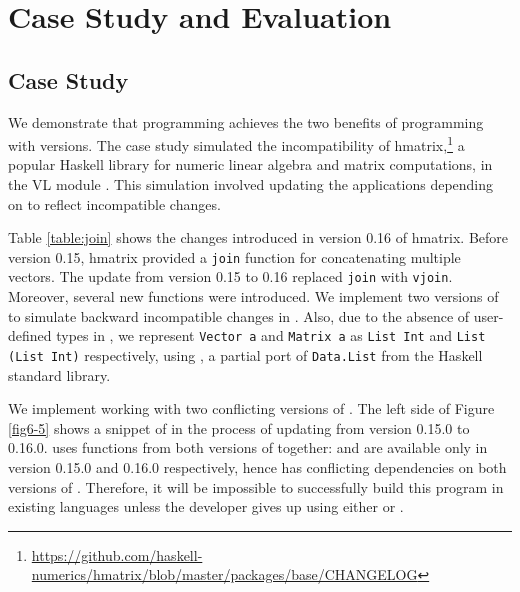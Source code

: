 \section{Case Study and Evaluation}
\label{casestudy}

\subsection{Case Study}
We demonstrate that \mylang{} programming achieves the two benefits of programming with versions. 
The case study simulated the incompatibility of hmatrix,\footnote{\url{https://github.com/haskell-numerics/hmatrix/blob/master/packages/base/CHANGELOG}} a popular Haskell library for numeric linear algebra and matrix computations, in the VL module .
This simulation involved updating the applications  depending on  to reflect incompatible changes.

Table \ref{table:join} shows the changes introduced in version 0.16 of hmatrix. Before version 0.15, hmatrix provided a \texttt{join} function for concatenating multiple vectors.
The update from version 0.15 to 0.16 replaced \texttt{join} with \texttt{vjoin}. Moreover, several new functions were introduced.
We implement two versions of  to simulate backward incompatible changes in \mylang{}.
Also, due to the absence of user-defined types in \mylang{}, we represent \texttt{Vector a} and \texttt{Matrix a} as \texttt{List Int} and \texttt{List (List Int)} respectively, using , a partial port of \texttt{Data.List} from the Haskell standard library.


We implement  working with two conflicting versions of . The left side of Figure \ref{fig6-5} shows a snippet of  in the process of updating  from version 0.15.0 to 0.16.0.  uses functions from both versions of  together:  and  are available only in version 0.15.0 and 0.16.0 respectively, hence  has conflicting dependencies on both versions of . Therefore, it will be impossible to successfully build this program in existing languages unless the developer gives up using either  or .

